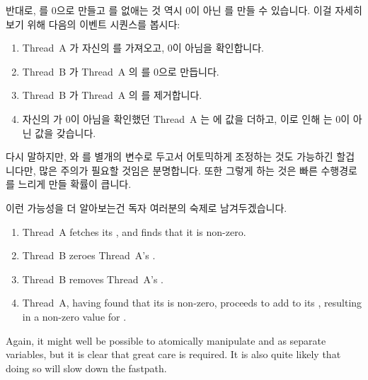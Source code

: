 \begin{enumerate}
	반대로,  를 0으로 만들고  를 없애는 것 역시
	0이 아닌  를 만들 수 있습니다.
	이걸 자세히 보기 위해 다음의 이벤트 시퀀스를 봅시다:

	\begin{enumerate}
	\item	Thread~A 가 자신의 를 가져오고, 0이 아님을
		확인합니다.
	\item	Thread~B 가 Thread~A 의  를 0으로 만듭니다.
	\item	Thread~B 가 Thread~A 의 를 제거합니다.
	\item	자신의  가 0이 아님을 확인했던 Thread~A 는
		 에 값을 더하고, 이로 인해  는 0이 아닌
		값을 갖습니다.
	\end{enumerate}

	다시 말하지만,  와  를 별개의 변수로 두고서
	어토믹하게 조정하는 것도 가능하긴 할겁니다만, 많은 주의가 필요할 것임은
	분명합니다.
	또한 그렇게 하는 것은 빠른 수행경로를 느리게 만들 확률이 큽니다.

	이런 가능성을 더 알아보는건 독자 여러분의 숙제로 남겨두겠습니다.
	\iffalse

	\begin{enumerate}
	\item	Thread~A fetches its , and finds that
		it is non-zero.
	\item	Thread~B zeroes Thread~A's .
	\item	Thread~B removes Thread~A's .
	\item	Thread~A, having found that its 
		is non-zero, proceeds to add to its ,
		resulting in a non-zero value for .
	\end{enumerate}

	Again, it might well be possible to atomically manipulate
	 and  as separate variables,
	but it is clear that great care is required.
	It is also quite likely that doing so will slow down the
	fastpath.


\end{enumerate}
